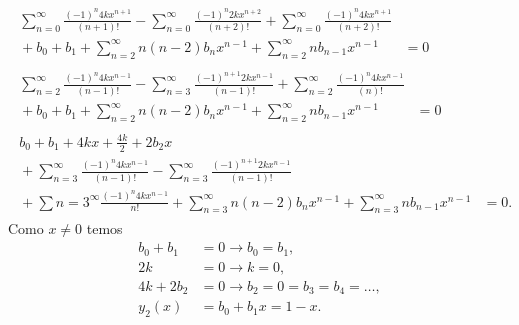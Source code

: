 \documentclass[a4paper,12pt, leqno, answers]{exam}
\begin{document}
\begin{questions}
\begin{solution}
\begin{align*}
            \begin{split}
                \sum_{n = 0}^\infty \frac{\left( -1 \right)^n 4 k x^{n + 1}}{\left( n + 1 \right)!} - \sum_{n = 0}^\infty \frac{\left( -1 \right)^n 2 k x^{n + 2}}{\left( n + 2 \right)!} + \sum_{n = 0}^\infty \frac{\left( -1 \right)^n 4 k x^{n + 1}}{\left( n + 2 \right)!} \\ {}+ b_0 + b_1 + \sum_{n = 2}^\infty n \left( n - 2 \right) b_n x^{n - 1} + \sum_{n = 2}^\infty n b_{n - 1} x^{n - 1} &= 0
            \end{split} \\
            \begin{split}
                \sum_{n = 2}^\infty \frac{\left( -1 \right)^n 4 k x^{n - 1}}{\left( n - 1 \right)!} - \sum_{n = 3}^\infty \frac{\left( -1 \right)^{n + 1} 2 k x^{n - 1}}{\left( n - 1 \right)!} + \sum_{n = 2}^\infty \frac{\left( -1 \right)^n 4 k x^{n - 1}}{\left( n \right)!} \\ {}+ b_0 + b_1 + \sum_{n = 2}^\infty n \left( n - 2 \right) b_n x^{n - 1} + \sum_{n = 2}^\infty n b_{n - 1} x^{n - 1} &= 0
            \end{split} \\
            \begin{split}
                b_0 + b_1 + 4 k x + \frac{4 k }{2} + 2 b_2 x \\ {}+ \sum_{n = 3}^\infty \frac{\left( -1 \right)^n 4 k x^{n - 1}}{\left( n - 1 \right)!} - \sum_{n = 3}^\infty \frac{\left( -1 \right)^{n + 1} 2 k x^{n -1}}{\left( n - 1 \right)!} \\ {}+ \sum{n = 3}^\infty \frac{\left( -1 \right)^n 4 k x^{n - 1}}{n!} + \sum_{n = 3}^\infty n \left( n - 2 \right) b_n x^{n - 1} + \sum_{n = 3}^\infty n b_{n - 1} x^{n - 1} &= 0.
            \end{split}
        \end{align*}
        Como $x \neq 0$ temos
        \begin{align*}
            b_0 + b_1 &= 0 \rightarrow b_0 = b_1, \\
            2 k &= 0 \rightarrow k = 0, \\
            4 k + 2 b_2 &= 0 \rightarrow b_2 = 0 = b_3 = b_4 = \ldots, \\
            y_2(x) &= b_0 + b_1 x = 1 - x.
        \end{align*}
    \end{solution}
\end{questions}
\end{document}
